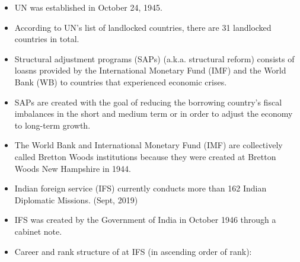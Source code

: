 \documentclass[]{book}
\providecommand{\tightlist}{%
  \setlength{\itemsep}{0pt}\setlength{\parskip}{0pt}}
\begin{document}
\begin{itemize}
\tightlist
\item
  UN was established in October 24, 1945.
\item
  According to UN's list of landlocked countries, there are 31 landlocked countries in total.
\item
  Structural adjustment programs (SAPs) (a.k.a. structural reform) consists of loasns provided by the International Monetary Fund (IMF) and the World Bank (WB) to countries that experienced economic crises.
\item
  SAPs are created with the goal of reducing the borrowing country's fiscal imbalances in the short and medium term or in order to adjust the economy to long-term growth.
\item
  The World Bank and International Monetary Fund (IMF) are collectively called Bretton Woods institutions because they were created at Bretton Woods New Hampshire in 1944.
\item
  Indian foreign service (IFS) currently conducts more than 162 Indian Diplomatic Missions. (Sept, 2019)
\item
  IFS was created by the Government of India in October 1946 through a cabinet note.
\item
  Career and rank structure of at IFS (in ascending order of rank):


\end{itemize}
\end{document}
